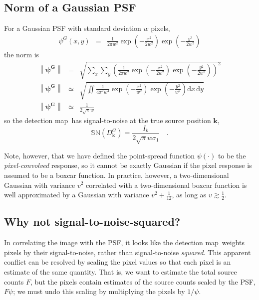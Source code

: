 \documentclass[11pt,letterpaper,linenumbers]{aastex63}
\newcommand{\detmap}{detection map}
\newcommand{\psf}{\psi}
\newcommand{\snr}[1]{\mathbb{SN}(#1)}
\newcommand{\norm}[1]{\left\lVert #1 \right\rVert}
\newcommand{\psfw}{w}
\renewcommand{\vec}[1]{\boldsymbol{#1}}
\newcommand{\kvec}{\vec{k}}
\begin{document}
\subsection{Norm of a Gaussian PSF}
\label{app:gaussnorm}
For a Gaussian PSF with standard deviation $\psfw$ pixels,
\begin{eqnarray}\displaystyle
\psf^G(x,y) &=& \frac{1}{2 \pi \psfw^2} \exp{\left(-\frac{x^2}{2 \psfw^2}\right)} \exp{\left(-\frac{y^2}{2 \psfw^2}\right)}
\end{eqnarray}
the norm is%
\begin{eqnarray}
\norm{\bm{\psf^G}} &=& \sqrt{ \sum_{x} \sum_{y} \left(\frac{1}{2 \pi \psfw^2} \exp{\left(-\frac{x^2}{2 \psfw^2}\right)} \exp{\left(-\frac{y^2}{2 \psfw^2}\right)} \right)^2} \\
\norm{\bm{\psf^G}} &\simeq& \sqrt{\iint \frac{1}{4 \pi^2 \psfw^4} \exp{\left(-\frac{x^2}{\psfw^2}\right)} \exp{\left(-\frac{y^2}{\psfw^2}\right)} \mathrm{d}x \, \mathrm{d}y} \\
\norm{\bm{\psf^G}} &\simeq& \frac{1}{2 \sqrt{\pi} \psfw}
\end{eqnarray}
so the \detmap\ has signal-to-noise at the true source position $\kvec$,
\begin{equation}
\snr{D_{\kvec}^G} = \frac{I_k}{2 \sqrt{\pi} \psfw \sigma_1 } \quad .
\label{eqn:sndsinglegauss}
\end{equation}

Note, however, that we have defined the point-spread function
$\psf(\cdot)$ to be the \emph{pixel-convolved} response, so it cannot
be exactly Gaussian if the pixel response is assumed to be a boxcar
function.  In practice, however, a two-dimensional Gaussian with
variance $v^2$ correlated with a two-dimensional boxcar function is
well approximated by a Gaussian with variance $v^2 + \frac{1}{12}$, as
long as $v \gtrsim \frac{1}{2}$.





\subsection{Why not signal-to-noise-squared?}
In correlating the image with the PSF, it looks like the
\detmap\ weights pixels by their signal-to-noise, rather than
signal-to-noise \emph{squared}.  This apparent conflict can be
resolved by scaling the pixel values so that each pixel is an estimate
of the same quantity.  That is, we want to estimate the total source
counts $F$, but the pixels contain estimates of the source counts
scaled by the PSF, $F \psf$; we must undo this scaling by multiplying
the pixels by $1/\psf$.
\end{document}
